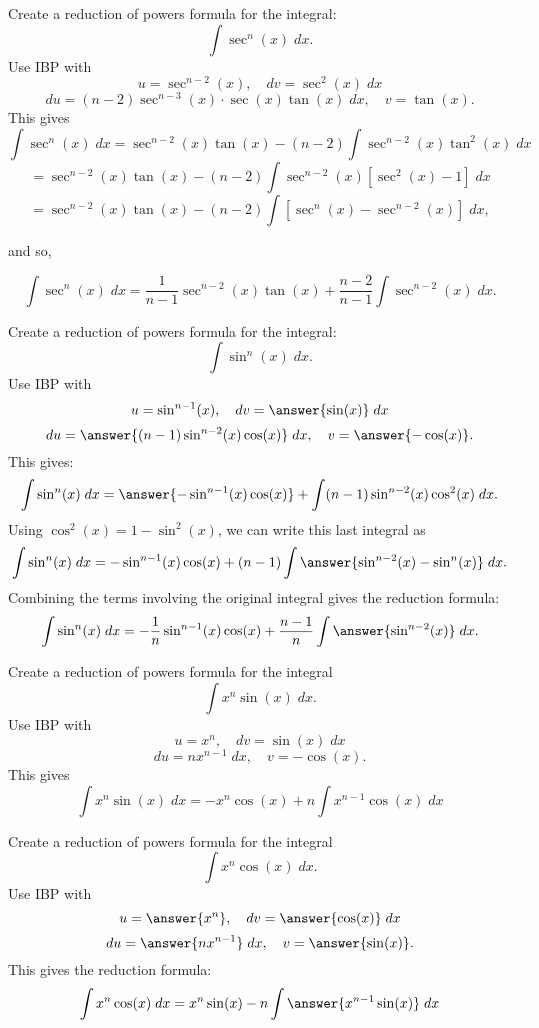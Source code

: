 \documentclass{ximera}
\begin{document}
\begin{example}
Create a reduction of powers formula for the integral:
\[
\int \sec^n(x) \; dx.
\]
Use IBP with
\[
u = \sec^{n-2}(x), \quad dv = \sec^2(x) \; dx
\]
\[
du = (n-2)\sec^{n-3}(x) \cdot \sec(x)\tan(x)\; dx,  \quad v = \tan(x).
\]
This gives
\[
\int \sec^n(x) \; dx = \sec^{n-2}(x)\tan(x) - (n-2)\int \sec^{n-2}(x)\tan^2(x) \; dx
\]
\[
= \sec^{n-2}(x)\tan(x) - (n-2)\int \sec^{n-2}(x)[\sec^2(x) - 1] \; dx
\]
\[
= \sec^{n-2}(x)\tan(x) - (n-2)\int [\sec^n(x)-\sec^{n-2}(x)]\; dx,
\]

and so,

\[
\int \sec^n(x) \; dx = \frac{1}{n-1}\sec^{n-2}(x)\tan(x) + \frac{n-2}{n-1}\int \sec^{n-2}(x) \; dx.
\]

\end{example}



\begin{problem}
Create a reduction of powers formula for the integral:
\[
\int \sin^n(x) \; dx.
\]
Use IBP with
\[
u = \sin^{n-1}(x), \quad dv = \answer{\sin(x)} \; dx
\]
\[
du = \answer{(n-1)\sin^{n-2}(x) \cos(x)}\; dx,  \quad v = \answer{-\cos(x)}.
\]
This gives:
\[
\int \sin^n(x) \; dx = \answer{-\sin^{n-1}(x)\cos(x)} + \int (n-1)\sin^{n-2}(x) \cos^2(x) \; dx.
\]
Using $\cos^2(x) = 1 -\sin^2(x)$, we can write this last integral as
\[
\int \sin^n(x) \; dx = -\sin^{n-1}(x)\cos(x) + (n-1)\int \answer{\sin^{n-2}(x)- \sin^n(x)} \; dx.
\]
Combining the terms involving the original integral gives the reduction formula:
\[
\int \sin^n(x) \; dx = -\frac{1}{n}\sin^{n-1}(x)\cos(x) + \frac{n-1}{n}\int \answer{\sin^{n-2}(x)} \; dx.
\]

\end{problem}



\begin{example}
Create a reduction of powers formula for the integral
\[
\int x^n\sin(x) \; dx.
\]
Use IBP with
\[
u = x^n, \quad dv = \sin(x) \; dx
\]
\[
du = nx^{n-1}\; dx,  \quad v = -\cos(x).
\]
This gives
\[
\int x^n\sin(x) \; dx = -x^n\cos(x) + n\int x^{n-1}\cos(x) \; dx
\]
\end{example}

\begin{problem}
Create a reduction of powers formula for the integral
\[
\int x^n\cos(x) \; dx.
\]
Use IBP with
\[
u = \answer{x^n}, \quad dv = \answer{\cos(x)} \; dx
\]
\[
du = \answer{nx^{n-1}}\; dx,  \quad v = \answer{\sin(x)}.
\]
This gives the reduction formula:
\[
\int x^n\cos(x) \; dx = x^n\sin(x) - n\int \answer{x^{n-1}\sin(x)} \; dx
\]
\end{problem}
\end{document}

